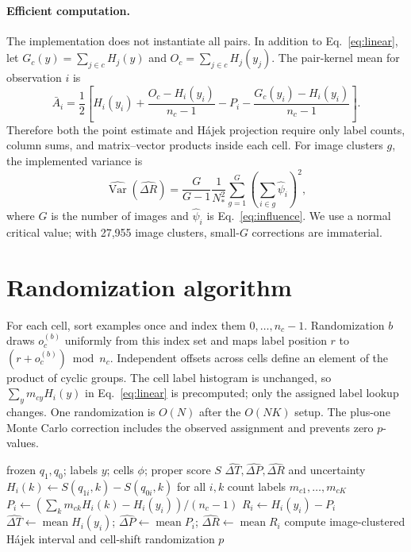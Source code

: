 \paragraph{Efficient computation.} The implementation does not instantiate all pairs. In addition to Eq.~\eqref{eq:linear},
let $G_c(y)=\sum_{j\in c}H_j(y)$ and $O_c=\sum_{j\in c}H_j(y_j)$. The pair-kernel mean
for observation $i$ is
\[
\bar A_i=\frac12\left[
H_i(y_i)+\frac{O_c-H_i(y_i)}{n_c-1}
-P_i-\frac{G_c(y_i)-H_i(y_i)}{n_c-1}
\right].
\]
Therefore both the point estimate and H\'ajek projection require only label counts,
column sums, and matrix--vector products inside each cell. For image clusters $g$, the
implemented variance is
\[
\widehat{\operatorname{Var}}(\widehat{\Delta R})
=\frac{G}{G-1}\frac1{N_*^2}\sum_{g=1}^G
\left(\sum_{i\in g}\widehat\psi_i\right)^2,
\]
where $G$ is the number of images and $\widehat\psi_i$ is
Eq.~\eqref{eq:influence}. We use a normal critical value; with 27,955 image clusters,
small-$G$ corrections are immaterial.

\section{Randomization algorithm}\label{app:random}

For each cell, sort examples once and index them $0,\ldots,n_c-1$. Randomization $b$
draws $o_c^{(b)}$ uniformly from this index set and maps label position $r$ to
$(r+o_c^{(b)})\bmod n_c$. Independent offsets across cells define an element of the
product of cyclic groups. The cell label histogram is unchanged, so
$\sum_y m_{cy}H_i(y)$ in Eq.~\eqref{eq:linear} is precomputed; only the assigned label
lookup changes. One randomization is $O(N)$ after the $O(NK)$ setup. The plus-one Monte
Carlo correction includes the observed assignment and prevents zero $p$-values.

\begin{algorithm}[t]
\caption{Gain decomposition by label transport}\label{alg:wager}
\begin{algorithmic}[1]
\Require frozen $q_1,q_0$; labels $y$; cells $\phi$; proper score $S$
\Ensure $\widehat{\Delta T},\widehat{\Delta P},\widehat{\Delta R}$ and uncertainty
\State $H_i(k)\gets S(q_{1i},k)-S(q_{0i},k)$ for all $i,k$
  \State count labels $m_{c1},\ldots,m_{cK}$
    \State $P_i\gets(\sum_k m_{ck}H_i(k)-H_i(y_i))/(n_c-1)$
    \State $R_i\gets H_i(y_i)-P_i$
  \EndFor
\EndFor
\State $\widehat{\Delta T}\gets\operatorname{mean}H_i(y_i)$;
$\widehat{\Delta P}\gets\operatorname{mean}P_i$;
$\widehat{\Delta R}\gets\operatorname{mean}R_i$
\State compute image-clustered H\'ajek interval and cell-shift randomization $p$
\end{algorithmic}
\end{algorithm}

